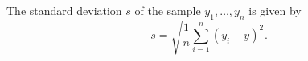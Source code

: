 \documentclass[11pt]{article}
\begin{document}
The standard deviation $s$ of the sample $y_1,\dots,y_n$ is given by
$$s = \sqrt{\frac{1}{n}\sum_{i=1}^n(y_i - \bar{y})^2}.$$
\end{document}
